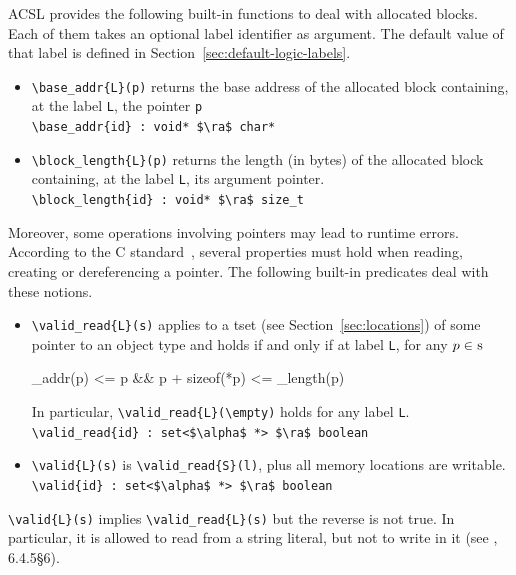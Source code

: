 ACSL provides the following built-in functions to deal with allocated blocks.
Each of them takes an optional label identifier as argument.
The default value of that label is defined in Section~\ref{sec:default-logic-labels}.
\begin{itemize}
\item \lstinline|\base_addr{L}(p)|
returns the base address of the allocated block
containing, at the label \lstinline|L|, the pointer \lstinline|p|
\\ \makebox[5mm]{} \lstinline|\base_addr{id} : void* $\ra$ char*|

\item \lstinline|\block_length{L}(p)|
  returns the length (in bytes) of the allocated block containing,
  at the label \lstinline|L|, its argument pointer.
\\ \makebox[5mm]{} \lstinline|\block_length{id} : void* $\ra$ size_t|

\end{itemize}


Moreover, some operations involving pointers may lead to runtime errors.
According to the C standard~\cite{standardc99}, several properties must hold
when reading, creating or dereferencing a pointer. The following built-in
predicates deal with these notions.


\begin{itemize}
\item \lstinline|\valid_read{L}(s)| applies to a tset
(see Section~\ref{sec:locations}) of some pointer to an object type and holds if
and only if at label \lstinline|L|, for any $p\in \lstinline|s|$
\begin{listing-nonumber}
\base_addr(p) <= p && p + sizeof(*p) <= \block_length(p)
\end{listing-nonumber}
In particular, \lstinline|\valid_read{L}(\empty)| holds for any label \lstinline|L|.
\\ \makebox[5mm]{} \lstinline|\valid_read{id} : set<$\alpha$ *> $\ra$ boolean|
\item \lstinline|\valid{L}(s)| is \lstinline|\valid_read{S}(l)|,
plus all memory locations are writable.
\\ \makebox[5mm]{} \lstinline|\valid{id} : set<$\alpha$ *> $\ra$ boolean|
\end{itemize}

\lstinline|\valid{L}(s)| implies \lstinline|\valid_read{L}(s)| but the reverse
is not true. In particular, it is allowed to read from a string literal, but not
to write in it (see \cite{standardc99}, 6.4.5\S6).

